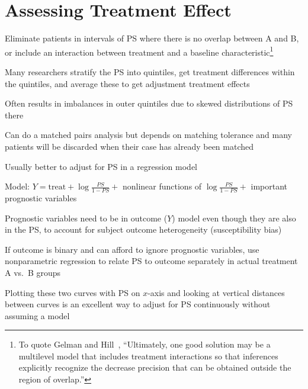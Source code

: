 \section{Assessing Treatment Effect}
\bi
\item Eliminate patients in intervals of PS where there is no overlap
  between A and B, or include an interaction between treatment and a
  baseline characteristic\footnote{To quote Gelman and
    Hill~\cite[Section 10.3]{gel06dat}, ``Ultimately, one good
    solution may be a multilevel model that includes treatment
    interactions so that inferences explicitly recognize the decrease
    precision that can be obtained outside the region of overlap.''}
\item Many researchers stratify the PS into quintiles, get treatment
  differences within the quintiles, and average these to get
  adjustment treatment effects
\item Often results in imbalances in outer quintiles due to skewed
  distributions of PS there
\item Can do a matched pairs analysis but depends on matching
  tolerance and many patients will be discarded when their case has
  already been matched
\item Usually better to adjust for PS in a regression model
\item Model: $Y = \textrm{treat} + \log\frac{PS}{1-PS} +$
  nonlinear functions of $\log\frac{PS}{1-PS} +$ important prognostic
    variables
\item Prognostic variables need to be in outcome ($Y$) model even
  though they are also in the PS, to account for subject outcome heterogeneity
  (susceptibility bias)
\item If outcome is binary and can afford to ignore prognostic
  variables, use nonparametric regression to relate PS to outcome
  separately in actual treatment A vs.\ B groups
\item Plotting these two curves with PS on $x$-axis and looking at
  vertical distances between curves is an excellent
  way to adjust for PS continuously without assuming a model
\ei

